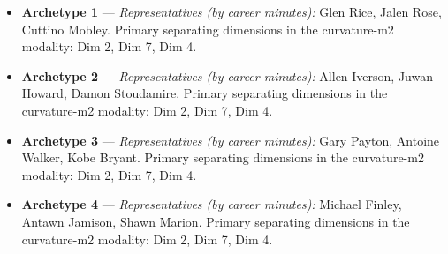 \begin{itemize}
\item \textbf{Archetype 1} --- \emph{Representatives (by career minutes):} Glen Rice, Jalen Rose, Cuttino Mobley. Primary separating dimensions in the curvature-m2 modality: Dim 2, Dim 7, Dim 4.
\item \textbf{Archetype 2} --- \emph{Representatives (by career minutes):} Allen Iverson, Juwan Howard, Damon Stoudamire. Primary separating dimensions in the curvature-m2 modality: Dim 2, Dim 7, Dim 4.
\item \textbf{Archetype 3} --- \emph{Representatives (by career minutes):} Gary Payton, Antoine Walker, Kobe Bryant. Primary separating dimensions in the curvature-m2 modality: Dim 2, Dim 7, Dim 4.
\item \textbf{Archetype 4} --- \emph{Representatives (by career minutes):} Michael Finley, Antawn Jamison, Shawn Marion. Primary separating dimensions in the curvature-m2 modality: Dim 2, Dim 7, Dim 4.
\end{itemize}
